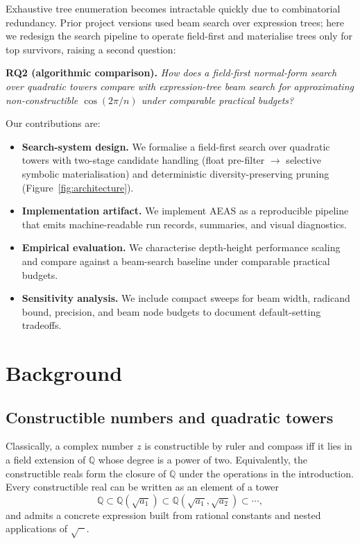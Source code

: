 \documentclass[11pt]{article}
\begin{document}
\medskip
Exhaustive tree enumeration becomes intractable quickly due to combinatorial redundancy.
Prior project versions used beam search over expression trees; here we redesign the search pipeline to operate field-first and materialise trees only for top survivors, raising a second question:

\medskip
\noindent\textbf{RQ2 (algorithmic comparison).}
\emph{How does a field-first normal-form search over quadratic towers compare with expression-tree beam search for approximating non-constructible $\cos(2\pi/n)$ under comparable practical budgets?}

\medskip
Our contributions are:
\begin{itemize}
  \item \textbf{Search-system design.} We formalise a field-first search over quadratic towers with two-stage candidate handling (float pre-filter $\rightarrow$ selective symbolic materialisation) and deterministic diversity-preserving pruning (Figure~\ref{fig:architecture}).
  \item \textbf{Implementation artifact.} We implement AEAS as a reproducible pipeline that emits machine-readable run records, summaries, and visual diagnostics.
  \item \textbf{Empirical evaluation.} We characterise depth-height performance scaling and compare against a beam-search baseline under comparable practical budgets.
  \item \textbf{Sensitivity analysis.} We include compact sweeps for beam width, radicand bound, precision, and beam node budgets to document default-setting tradeoffs.
\end{itemize}

\section{Background}

\subsection{Constructible numbers and quadratic towers}

Classically, a complex number $z$ is constructible by ruler and compass iff it lies in a field extension of $\mathbb{Q}$ whose degree is a power of two.
Equivalently, the constructible reals form the closure of $\mathbb{Q}$ under the operations in the introduction.
Every constructible real can be written as an element of a tower
\[
  \mathbb{Q} \subset \mathbb{Q}(\sqrt{a_1}) \subset
  \mathbb{Q}(\sqrt{a_1},\sqrt{a_2}) \subset \cdots,
\]
and admits a concrete expression built from rational constants and nested applications of $\sqrt{\phantom{x}}$.
\end{document}

